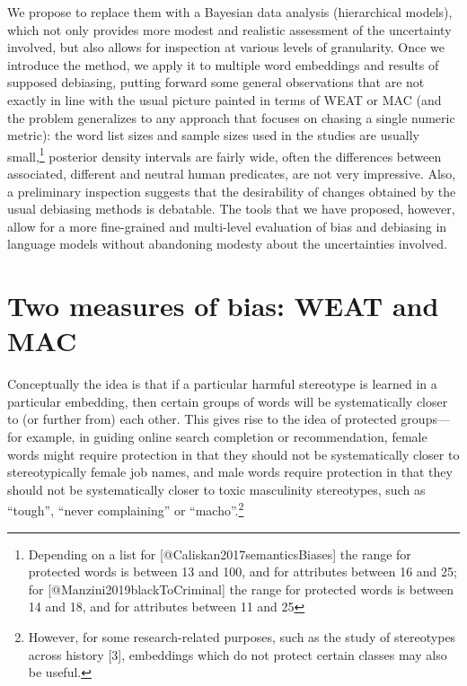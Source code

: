 \documentclass[
  10pt,
  dvipsnames,enabledeprecatedfontcommands]{scrartcl}
\begin{document}
We propose to replace them with a Bayesian data analysis (hierarchical
models), which not only provides more modest and realistic assessment of
the uncertainty involved, but also allows for inspection at various
levels of granularity. Once we introduce the method, we apply it to
multiple word embeddings and results of supposed debiasing, putting
forward some general observations that are not exactly in line with the
usual picture painted in terms of WEAT or MAC (and the problem
generalizes to any approach that focuses on chasing a single numeric
metric): the word list sizes and sample sizes used in the studies are
usually
small,\footnote{Depending on a list for [@Caliskan2017semanticsBiases] the range for protected words is between 13 and 100, and for attributes between 16 and 25; for [@Manzini2019blackToCriminal] the range for protected words is between 14 and 18, and for attributes between 11 and 25}
posterior density intervals are fairly wide, often the differences
between associated, different and neutral human predicates, are not very
impressive. Also, a preliminary inspection suggests that the
desirability of changes obtained by the usual debiasing methods is
debatable. The tools that we have proposed, however, allow for a more
fine-grained and multi-level evaluation of bias and debiasing in
language models without abandoning modesty about the uncertainties
involved.

\hypertarget{two-measures-of-bias-weat-and-mac}{%
\section{Two measures of bias: WEAT and
MAC}\label{two-measures-of-bias-weat-and-mac}}

Conceptually the idea is that if a particular harmful stereotype is
learned in a particular embedding, then certain groups of words will be
systematically closer to (or further from) each other. This gives rise
to the idea of protected groups---for example, in guiding online search
completion or recommendation, female words might require protection in
that they should not be systematically closer to stereotypically female
job names, and male words require protection in that they should not be
systematically closer to toxic masculinity stereotypes, such as
``tough'', ``never complaining'' or ``macho''.\footnote{However, for
  some research-related purposes, such as the study of stereotypes
  across history {[}3{]}, embeddings which do not protect certain
  classes may also be useful.}
\end{document}
